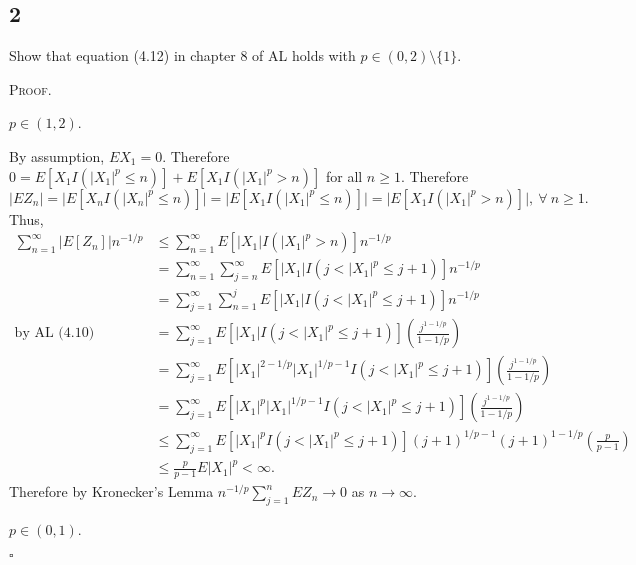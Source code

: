 \documentclass[12pt]{article}
\newcounter{ProofCounter}
\newenvironment{Proof}{\stepcounter{ProofCounter}\textsc{Proof.}}{\hfill$\square$}
\begin{document}
\newpage 
\subsection*{2}
\begin{tcolorbox}
Show that equation (4.12) in chapter 8 of AL holds with $p \in (0,2) \setminus \{1\}$.
\end{tcolorbox}
\begin{Proof}
\begin{description}[leftmargin=4mm]
\item[Case 1:] $p \in (1,2)$.

By assumption, $EX_{1} = 0$. Therefore $0 = E[X_{1}I(|X_{1}|^{p} \leq n)] + E[X_{1}I(|X_{1}|^{p} > n)]$ for all $n \geq 1$. Therefore 
\[ |EZ_{n}| = \big|E[X_{n}I(|X_{n}|^{p} \leq n)]\big| = \big|E[X_{1}I(|X_{1}|^{p} \leq n)]\big| = \big|E[X_{1}I(|X_{1}|^{p} > n)]\big|, \ \forall \ n \geq 1. \]
Thus,
\begin{align*}
\sum_{n=1}^{\infty}|E[Z_{n}]|n^{-1/p} & \leq \sum_{n=1}^{\infty}E\left[ |X_{1}|I(|X_{1}|^{p} > n) \right]n^{-1/p} \\
& = \sum_{n=1}^{\infty}\sum_{j=n}^{\infty} E\left[ |X_{1}|I(j < |X_{1}|^{p} \leq j+1) \right]n^{-1/p} \\
& = \sum_{j=1}^{\infty}\sum_{n=1}^{j}E\left[ |X_{1}|I(j < |X_{1}|^{p} \leq j + 1) \right]n^{-1/p} \\
\text{by AL (4.10) } & = \sum_{j=1}^{\infty}E\left[ |X_{1}|I(j < |X_{1}|^{p} \leq j + 1) \right]\left( \frac{j^{1-1/p}}{1-1/p} \right) \\
& = \sum_{j=1}^{\infty}E\left[ |X_{1}|^{2-1/p}|X_{1}|^{1/p-1}I(j < |X_{1}|^{p} \leq j + 1) \right]\left( \frac{j^{1-1/p}}{1-1/p} \right) \\
& = \sum_{j=1}^{\infty}E\left[ |X_{1}|^{p}|X_{1}|^{1/p-1}I(j < |X_{1}|^{p} \leq j + 1) \right]\left( \frac{j^{1-1/p}}{1-1/p} \right) \\
& \leq \sum_{j=1}^{\infty}E\left[ |X_{1}|^{p}I(j < |X_{1}|^{p} \leq j + 1) \right](j+1)^{1/p - 1}(j+1)^{1-1/p}\left( \frac{p}{p-1} \right) \\
& \leq \frac{p}{p-1}E|X_{1}|^{p} < \infty.
\end{align*}
Therefore by Kronecker's Lemma $n^{-1/p}\sum_{j=1}^{n}EZ_{n} \rightarrow 0$ as $n \rightarrow \infty$.

\item[Case 2:] $p \in (0,1)$.


\end{description}
\end{Proof}
\end{document}
